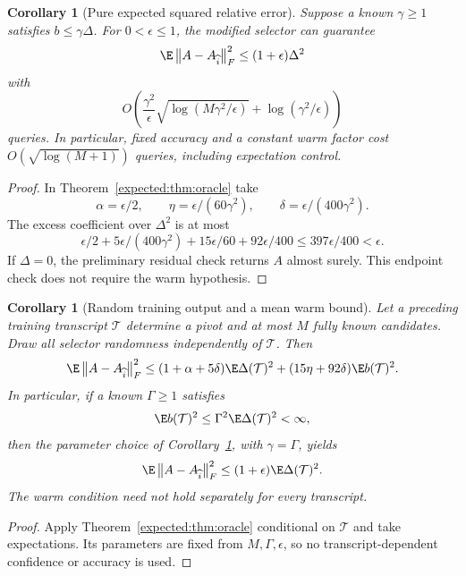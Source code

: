 \documentclass[11pt,oneside,openany,a4paper]{book}
\numberwithin{equation}{chapter}
\newtheorem{corollary}[theorem]{Corollary}
\theoremstyle{definition}
\theoremstyle{remark}
\newcommand{\F}[1]{\left\lVert#1\right\rVert_F}
\begin{document}
\begin{corollary}[Pure expected squared relative error]\label{expected:cor:warm}
Suppose a known $\gamma\ge1$ satisfies $b\le\gamma\Delta$.
For $0<\epsilon\le1$, the modified selector can guarantee
\[
 \E\F{A-A_{\widehat i}}^2\le(1+\epsilon)\Delta^2
\]
with
\begin{equation}\label{expected:eq:warm-cost}
 O\!\left(\frac{\gamma^2}{\epsilon}
       \sqrt{\log(M\gamma^2/\epsilon)}
       +\log(\gamma^2/\epsilon)\right)
\end{equation}
queries. In particular, fixed accuracy and a constant warm factor
cost $O(\sqrt{\log(M+1)})$ queries, including expectation control.
\end{corollary}
\begin{proof}
In Theorem~\ref{expected:thm:oracle} take
\[
 \alpha=\epsilon/2,\qquad
 \eta=\epsilon/(60\gamma^2),\qquad
 \delta=\epsilon/(400\gamma^2).
\]
The excess coefficient over $\Delta^2$ is at most
\[
 \epsilon/2+5\epsilon/(400\gamma^2)
             +15\epsilon/60+92\epsilon/400
 \le397\epsilon/400<\epsilon.
\]
If $\Delta=0$, the preliminary residual check returns $A$ almost
surely. This endpoint check does not require the warm hypothesis.
\end{proof}

\begin{corollary}[Random training output and a mean warm bound]
\label{expected:cor:training}
Let a preceding training transcript $\mathcal T$ determine a pivot
and at most $M$ fully known candidates. Draw all selector randomness
independently of $\mathcal T$. Then
\[
 \E\F{A-A_{\widehat i}}^2
 \le(1+\alpha+5\delta)\E\Delta(\mathcal T)^2
      +(15\eta+92\delta)\E b(\mathcal T)^2.
\]
In particular, if a known $\Gamma\ge1$ satisfies
\[
 \E b(\mathcal T)^2\le\Gamma^2\E\Delta(\mathcal T)^2<\infty,
\]
then the parameter choice of Corollary~\ref{expected:cor:warm}, with
$\gamma=\Gamma$, yields
\[
 \E\F{A-A_{\widehat i}}^2
    \le(1+\epsilon)\E\Delta(\mathcal T)^2.
\]
The warm condition need not hold separately for every transcript.
\end{corollary}
\begin{proof}
Apply Theorem~\ref{expected:thm:oracle} conditional on $\mathcal T$ and take
expectations. Its parameters are fixed from $M,\Gamma,\epsilon$,
so no transcript-dependent confidence or accuracy is used.
\end{proof}
\end{document}
